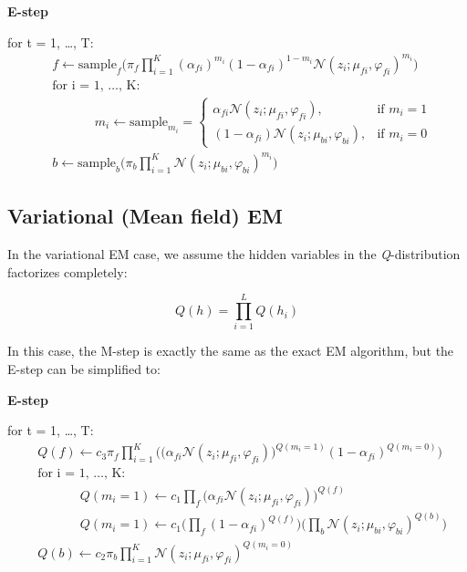 \documentclass{article} %
\begin{document}
\textbf{E-step}

for t = 1, \ldots , T:
\begin{align*} 
&f \leftarrow \text{sample}_{f}\Bigg(\pi_f \prod_{i=1}^K {(\alpha_{fi})}^{m_{i}} {(1-\alpha_{fi})}^{1-m_{i}}\mathcal{N}(z_i;\mu_{fi},\varphi_{fi})^{m_{i}}\Bigg)\\
&\text{for i = 1, \ldots , K: } \\
& \text{ }\text{ }\text{ }\text{ }\text{ }m_i \leftarrow \text{sample}_{m_i}=\begin{cases}
\alpha_{fi}\mathcal{N}(z_i;\mu_{fi},\varphi_{fi}), & \text{if $m_i = 1$}\\
(1-\alpha_{fi})\mathcal{N}(z_i;\mu_{bi},\varphi_{bi}), & \text{if $m_i = 0$}
\end{cases} \\
&b \leftarrow \text{sample}_{b}\Bigg(\pi_b \prod_{i=1}^K \mathcal{N}(z_i;\mu_{bi},\varphi_{bi})^{m_{i}}\Bigg)
\end{align*} 

\subsection{Variational (Mean field) EM}
\label{gibbs_em}

In the variational EM case, we assume the hidden variables in the \textit{Q}-distribution factorizes completely:

\begin{equation}
Q(h) = \prod_{i=1}^LQ(h_i) 
\label{eq:eq10}
\end{equation}

In this case, the M-step is exactly the same as the exact EM algorithm, but the E-step can be simplified to:

\textbf{E-step}

for t = 1, \ldots , T:
\begin{align*} 
&Q(f) \leftarrow c_3\pi_f\prod_{i=1}^K\Bigg(\Big(\alpha_{fi}\mathcal{N}(z_i;\mu_{fi},\varphi_{fi})\Big)^{Q(m_i=1)} (1-\alpha_{fi})^{Q(m_i=0)} \Bigg) \\
&\text{for i = 1, \ldots , K: } \\
&\text{ }\text{ }\text{ }\text{ }\text{ }Q(m_i = 1) \leftarrow c_1\prod_{f}\Bigg(\alpha_{fi}\mathcal{N}(z_i;\mu_{fi},\varphi_{fi})\Bigg)^{Q(f)}\\
&\text{ }\text{ }\text{ }\text{ }\text{ }Q(m_i = 1) \leftarrow c_1\Bigg(\prod_{f}(1-\alpha_{fi})^{Q(f)}\Bigg)\Bigg(\prod_{b}\mathcal{N}(z_i;\mu_{bi},\varphi_{bi})^{Q(b)}\Bigg)\\
&Q(b) \leftarrow c_2\pi_b\prod_{i=1}^K\mathcal{N}(z_i;\mu_{fi},\varphi_{fi})^{Q(m_i=0)}
\end{align*} 
\end{document}

